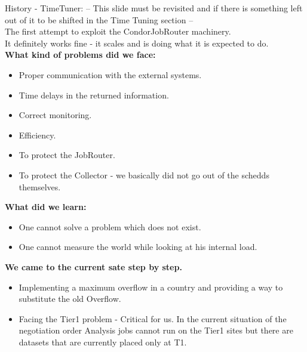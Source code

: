 \documentclass[8pt,mathserif,a4paper,oneside,pdf]{beamer}
\begin{document}
\begin{frame}[fragile]{History - TimeTuner:}
  -- This slide must be revisited and if there is something left out of it to be shifted in the Time Tuning section --\\
  The first attempt to exploit the CondorJobRouter machinery.\\
  It definitely works fine - it scales and is doing what it is expected to do.\\
  \textbf{What kind of problems did we face:}
  \begin{itemize}
  \item
    Proper communication with the external systems.
  \item
    Time delays in the returned information.
  \item
    Correct monitoring.
  \item
    Efficiency.
  \item
    To protect the JobRouter.
  \item
    To protect the Collector - we basically did not go out of the schedds themselves.
  \end{itemize}
  \textbf{What did we learn:}
  \begin{itemize}
  \item
    One cannot solve a problem which does not exist.
  \item
    One cannot measure the world while looking at his internal load.
  \end{itemize}
  \textbf{We came to the current sate step by step.}
  \begin{itemize}
  \item
    Implementing a maximum overflow in a country and providing a way to substitute the old Overflow.
  \item
    Facing the Tier1 problem - Critical for us. In the current situation of the negotiation order Analysis jobs cannot
    run on the Tier1 sites but there are datasets that are currently placed only at T1.
  \end{itemize}
\end{frame}
\end{document}
